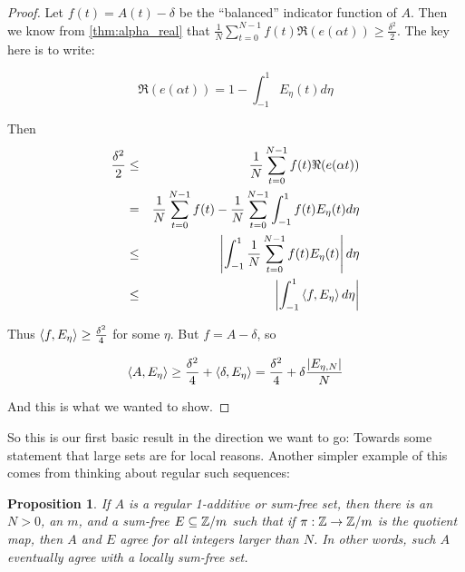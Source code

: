 \documentclass{report}
\newtheorem{proposition}[theorem]{Proposition}
\theoremstyle{remark}
\numberwithin{equation}{section}
\begin{document}
\begin{proof}
  Let $f(t) = A(t) - \delta$ be the ``balanced'' indicator function of
  $A$.  Then we know from \ref{thm:alpha_real} that $\frac{1}{N}\sum_{t=0}^{N-1}
  f(t)\Re(e(\alpha t)) \geq \frac{\delta^2}{2}$.  The key here is to
  write: 

  \[\Re(e(\alpha t)) = 1-\int_{-1}^1 E_\eta(t)d\eta\]

  Then 
  \begin{eqnarray*}
    \frac{\delta^2}{2} &\leq& \frac{1}{N}\sum_{t=0}^{N-1}
                              f(t)\Re(e(\alpha t)) \\
                       &=& \frac{1}{N}\sum_{t=0}^{N-1}
                           f(t) -  \frac{1}{N}\sum_{t=0}^{N-1}
                           \int_{-1}^1 f(t) E_\eta(t)d\eta\\
                       &\leq& \left|\int_{-1}^1 \frac{1}{N}\sum_{t=0}^{N-1} f(t) E_\eta(t)\right|d\eta\\
                       &\leq& \left|\int_{-1}^1 \left<f, E_\eta\right> d\eta\right|
\end{eqnarray*}

Thus $\left<f, E_\eta\right> \geq \frac{\delta^2}{4}$ for some $\eta$.  But
$f = A - \delta$, so 

\[\left<A, E_\eta\right> \geq \frac{\delta^2}{4} + \left<\delta, E_\eta\right> =
  \frac{\delta^2}{4} + \delta \frac{|E_{\eta,N}|}{N}\]

And this is what we wanted to show.
\end{proof}

So this is our first basic result in the direction we want to go:
Towards some statement that large \relevant sets are \relevant for
local reasons.  Another simpler example of this comes from thinking
about regular such sequences: 

\begin{proposition}\label{prop:regular_sumfree}
  If $A$ is a regular 1-additive or sum-free set, then there is an
  $N > 0$, an $m$, and a sum-free $E \subseteq \mathbb{Z}/m$ such that if
  $\pi : \mathbb{Z} \to \mathbb{Z}/m$ is the quotient map, then $A$ and $E$ agree for
  all integers larger than $N$.  In other words, such $A$ eventually
  agree with a locally sum-free set. 
\end{proposition}
\end{document}
